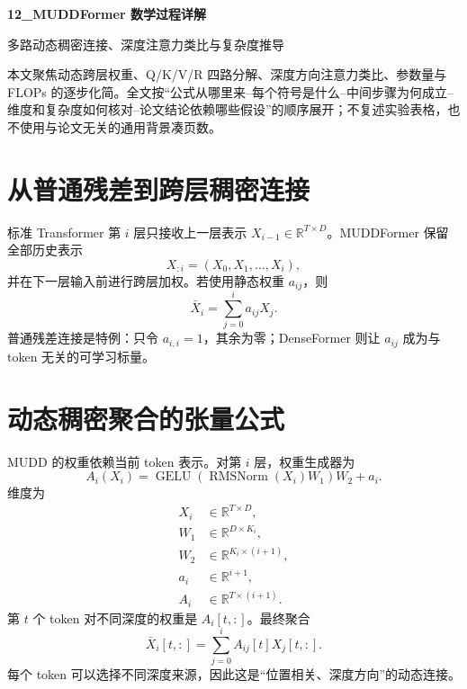 \documentclass[UTF8,12pt,a4paper,fontset=none]{ctexart}
\numberwithin{equation}{section}
\newcommand{\R}{\mathbb{R}}
\begin{document}
\begin{center}
{\LARGE\bfseries 12\_MUDDFormer 数学过程详解}\par
\vspace{0.35em}
{\large 多路动态稠密连接、深度注意力类比与复杂度推导}
\end{center}
\vspace{0.45em}
\begin{keybox}[本文只处理真正需要推导的部分]
本文聚焦动态跨层权重、Q/K/V/R 四路分解、深度方向注意力类比、参数量与 FLOPs 的逐步化简。全文按“公式从哪里来--每个符号是什么--中间步骤为何成立--维度和复杂度如何核对--论文结论依赖哪些假设”的顺序展开；不复述实验表格，也不使用与论文无关的通用背景凑页数。
\end{keybox}
\tableofcontents
\newpage

\section{从普通残差到跨层稠密连接}
标准 Transformer 第 $i$ 层只接收上一层表示 $X_{i-1}\in\R^{T\times D}$。MUDDFormer 保留全部历史表示
\begin{equation}
 X_{:i}=(X_0,X_1,\ldots,X_i),
\end{equation}
并在下一层输入前进行跨层加权。若使用静态权重 $a_{ij}$，则
\begin{equation}
 \bar X_i=\sum_{j=0}^{i}a_{ij}X_j.
\end{equation}
普通残差连接是特例：只令 $a_{i,i}=1$，其余为零；DenseFormer 则让 $a_{ij}$ 成为与 token 无关的可学习标量。

\section{动态稠密聚合的张量公式}
MUDD 的权重依赖当前 token 表示。对第 $i$ 层，权重生成器为
\begin{equation}
 A_i(X_i)=\operatorname{GELU}(\operatorname{RMSNorm}(X_i)W_1)W_2+a_i.
\end{equation}
维度为
\begin{align}
 X_i&\in\R^{T\times D},\\
 W_1&\in\R^{D\times K_i},\\
 W_2&\in\R^{K_i\times(i+1)},\\
 a_i&\in\R^{i+1},\\
 A_i&\in\R^{T\times(i+1)}.
\end{align}
第 $t$ 个 token 对不同深度的权重是 $A_i[t,:]$。最终聚合
\begin{equation}
 \boxed{\bar X_i[t,:]=\sum_{j=0}^{i}A_{ij}[t]X_j[t,:].}
\end{equation}
每个 token 可以选择不同深度来源，因此这是“位置相关、深度方向”的动态连接。
\end{document}
